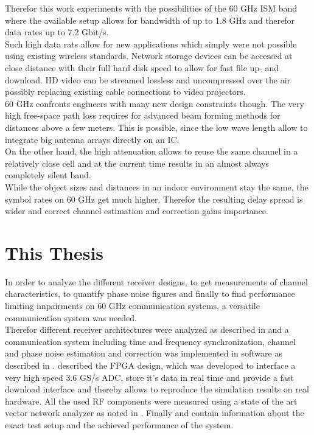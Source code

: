 Therefor this work experiments with the possibilities of the 60 GHz
\gls{ISM} band where the available setup allows for bandwidth of up to
1.8 GHz and therefor data rates up to 7.2 Gbit/s. \\

Such high data rats allow for new applications which simply were not possible
using existing wireless standards. Network storage devices can be accessed
at close distance with their full hard disk speed to allow for fast file
up- and download. \gls{HD} video can be streamed lossless and uncompressed
over the air possibly replacing existing cable connections to video
projectors. \\

60 GHz confronts engineers with many new design constraints though. The very
high free-space path loss requires for advanced beam forming methods
for distances above a few meters.
This is possible, since the low wave length allow to integrate
big antenna arrays directly on an \gls{IC}. \\

On the other hand, the high attenuation allows to reuse the same channel
in a relatively close cell and at the current time results in an almost
always completely silent band. \\

While the object sizes and distances in an indoor environment stay the same,
the symbol rates on 60 GHz get much higher. Therefor the resulting
delay spread is wider and correct channel estimation and correction
gains importance.  \\

\section{This Thesis}
In order to analyze the different receiver designs,
to get measurements of channel characteristics,
to quantify phase noise figures and finally to find
performance limiting impairments on 60 GHz communication
systems, a versatile communication system was needed. \\

Therefor different receiver architectures were analyzed as described in
 and a communication system including time and frequency
synchronization, channel and phase noise estimation and correction was
implemented in software as described in .
 described the \gls{FPGA} design, which was developed
to interface a very high speed 3.6 GS/s \gls{ADC},
store it's data in real time and provide a fast download interface
and thereby allows to reproduce the simulation results on real hardware.
All the used \gls{RF} components were measured using a state of the art
vector network analyzer as noted in .
Finally  and  contain information
about the exact test setup and the achieved performance of the system. \\

